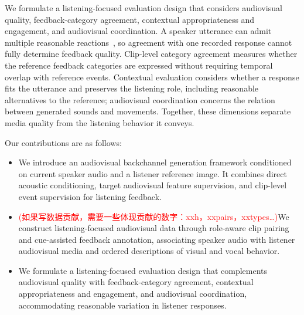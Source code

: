 We formulate a listening-focused evaluation design that considers
audiovisual quality, feedback-category agreement, contextual
appropriateness and engagement, and audiovisual coordination. A speaker
utterance can admit multiple reasonable reactions~\cite{learningtolisten,reactface},
so agreement with one recorded response cannot fully determine feedback
quality. Clip-level category agreement measures whether the reference
feedback categories are expressed without requiring temporal overlap with
reference events. Contextual evaluation considers whether a response fits
the utterance and preserves the listening role, including reasonable
alternatives to the reference; audiovisual coordination concerns the
relation between generated sounds and movements. Together, these
dimensions separate media quality from the listening behavior it conveys.

Our contributions are as follows:
\begin{itemize}
    \item We introduce an audiovisual backchannel generation framework
    conditioned on current speaker audio and a listener reference image.
    It combines direct acoustic conditioning, target audiovisual feature
    supervision, and clip-level event supervision for listening feedback.

    \item \textcolor{red}{(如果写数据贡献，需要一些体现贡献的数字：xxh，xxpairs，xxtypes…)}We construct listening-focused audiovisual data through
    role-aware clip pairing and cue-assisted feedback annotation,
    associating speaker audio with listener audiovisual media and ordered
    descriptions of visual and vocal behavior.

    \item We formulate a listening-focused evaluation design that
    complements audiovisual quality with feedback-category agreement,
    contextual appropriateness and engagement, and audiovisual
    coordination, accommodating reasonable variation in listener responses.
\end{itemize}





